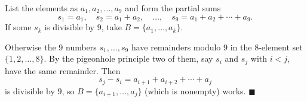 List the elements as $a_1,a_2,\dots,a_9$ and form the partial sums
\[
s_1=a_1,\quad s_2=a_1+a_2,\quad\dots,\quad s_9=a_1+a_2+\cdots+a_9 .
\]
If some $s_k$ is divisible by $9$, take $B=\{a_1,\dots,a_k\}$.

Otherwise the $9$ numbers $s_1,\dots,s_9$ have remainders modulo $9$ in the $8$-element set $\{1,2,\dots,8\}$. By the pigeonhole principle two of them, say $s_i$ and $s_j$ with $i<j$, have the same remainder. Then
\[
s_j-s_i=a_{i+1}+a_{i+2}+\cdots+a_j
\]
is divisible by $9$, so $B=\{a_{i+1},\dots,a_j\}$ (which is nonempty) works. $\blacksquare$
